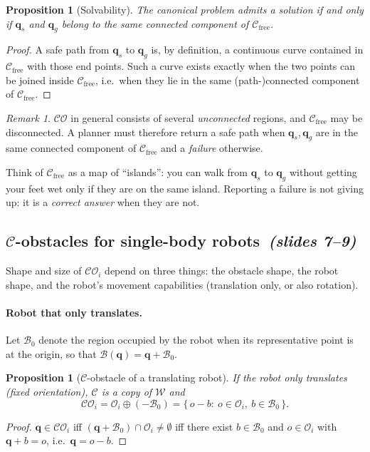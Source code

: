 \documentclass[11pt,a4paper]{article}
\newcommand{\Cspace}{\mathcal{C}}
\newcommand{\Wspace}{\mathcal{W}}
\newcommand{\Cfree}{\mathcal{C}_{\mathrm{free}}}
\newcommand{\CO}{\mathcal{CO}}
\newcommand{\Obs}{\mathcal{O}}
\newcommand{\Rob}{\mathcal{B}}
\newcommand{\vq}{\boldsymbol{q}}
\newcommand{\qs}{\boldsymbol{q}_s}
\newcommand{\qg}{\boldsymbol{q}_g}
\newcommand{\Mink}{\oplus}
\newcommand{\slides}[1]{\emph{(slides #1)}}
\newcommand{\subsect}[2]{\subsection{#1\texorpdfstring{\ \slides{#2}}{ (slides #2)}}}
\theoremstyle{definition}
\theoremstyle{plain}
\newtheorem{proposition}[definition]{Proposition}
\theoremstyle{remark}
\newtheorem{remark}[definition]{Remark}
\begin{document}
\begin{proposition}[Solvability]
\label{prop:solvability}
The canonical problem admits a solution if and only if $\qs$ and $\qg$ belong to the same connected component of $\Cfree$.
\end{proposition}
\begin{proof}
A safe path from $\qs$ to $\qg$ is, by definition, a continuous curve contained in $\Cfree$ with those end points. Such a curve exists exactly when the two points can be joined inside $\Cfree$, i.e.\ when they lie in the same (path-)connected component of $\Cfree$.
\end{proof}

\begin{remark}
$\CO$ in general consists of several \emph{unconnected} regions, and $\Cfree$ may be disconnected. A planner must therefore return a safe path when $\qs,\qg$ are in the same connected component of $\Cfree$ and a \emph{failure} otherwise.
\end{remark}

\begin{intuition}
Think of $\Cfree$ as a map of ``islands'': you can walk from $\qs$ to $\qg$ without getting your feet wet only if they are on the same island. Reporting a failure is not giving up: it is a \emph{correct answer} when they are not.
\end{intuition}

\subsect{\texorpdfstring{$\Cspace$}{C}-obstacles for single-body robots}{7--9}

Shape and size of $\CO_i$ depend on three things: the obstacle shape, the robot shape, and the robot's movement capabilities (translation only, or also rotation).

\paragraph{Robot that only translates.}
Let $\Rob_0$ denote the region occupied by the robot when its representative point is at the origin, so that $\Rob(\vq)=\vq+\Rob_0$.

\begin{proposition}[$\Cspace$-obstacle of a translating robot]
\label{prop:mink}
If the robot only translates (fixed orientation), $\Cspace$ is a copy of $\Wspace$ and
\[
  \CO_i=\Obs_i\Mink(-\Rob_0)=\{\,o-b:\ o\in\Obs_i,\ b\in\Rob_0\,\}.
\]
\end{proposition}
\begin{proof}
$\vq\in\CO_i$ iff $(\vq+\Rob_0)\cap\Obs_i\neq\emptyset$ iff there exist $b\in\Rob_0$ and $o\in\Obs_i$ with $\vq+b=o$, i.e.\ $\vq=o-b$.
\end{proof}
\end{document}
